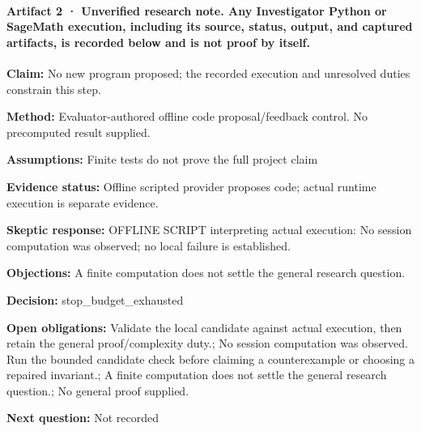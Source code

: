 \documentclass[11pt]{article}
\begin{document}
\paragraph{Artifact 2 · Unverified research note. Any Investigator Python or SageMath execution, including its source, status, output, and captured artifacts, is recorded below and is not proof by itself.}
\textbf{Claim:} No new program proposed; the recorded execution and unresolved duties constrain this step.\par
\textbf{Method:} Evaluator-authored offline code proposal/feedback control. No precomputed result supplied.\par
\textbf{Assumptions:} Finite tests do not prove the full project claim\par
\textbf{Evidence status:} Offline scripted provider proposes code; actual runtime execution is separate evidence.\par
\textbf{Skeptic response:} OFFLINE SCRIPT interpreting actual execution: No session computation was observed; no local failure is established.\par
\textbf{Objections:} A finite computation does not settle the general research question.\par
\textbf{Decision:} stop\_budget\_exhausted\par
\textbf{Open obligations:} Validate the local candidate against actual execution, then retain the general proof/complexity duty.; No session computation was observed. Run the bounded candidate check before claiming a counterexample or choosing a repaired invariant.; A finite computation does not settle the general research question.; No general proof supplied.\par
\textbf{Next question:} Not recorded\par
\end{document}
